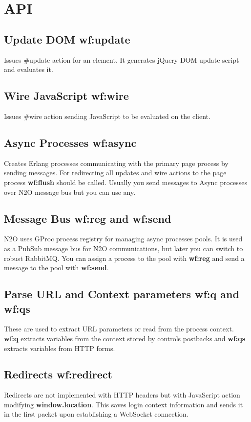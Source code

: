 \section{API}

\subsection{Update DOM \bf{wf:update}}
Issues \#update{} action for an element.
It generates jQuery DOM update script and evaluates it.

\subsection{Wire JavaScript \bf{wf:wire}}
Issues \#wire{} action sending JavaScript to be evaluated on the client.

\subsection{Async Processes \bf{wf:async}}
Creates Erlang processes communicating with the primary page process by sending messages.
For redirecting all updates and wire actions to the page process {\bf wf:flush} should be called.
Usually you send messages to Async processes over N2O message bus but you can use any.

\subsection{Message Bus {\bf wf:reg} and {\bf wf:send}}
N2O uses GProc process registry for managing async processes pools.
It is used as a PubSub message bus for N2O communications, but later you can switch to robust RabbitMQ.
You can assign a process to the pool with {\bf wf:reg} and send a message to the pool with {\bf wf:send}.

\subsection{Parse URL and Context parameters {\bf wf:q} and {\bf wf:qs}}
These are used to extract URL parameters or read from the process context. {\bf wf:q} extracts variables
from the context stored by controls postbacks and {\bf wf:qs} extracts variables from HTTP forms.

\subsection{Redirects {\bf wf:redirect}}
Redirects are not implemented with HTTP headers but with JavaScript action modifying {\bf window.location}.
This saves login context information and sends it in the first packet upon establishing a WebSocket connection.

